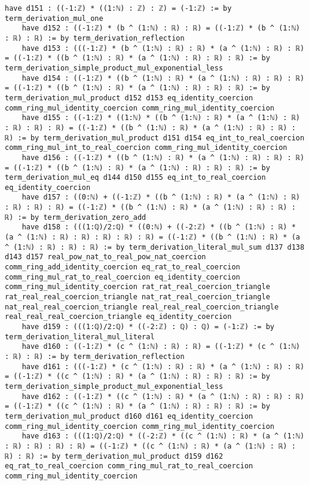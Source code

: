 \documentclass{article}
\begin{document}
\begin{tcolorbox}[colback=white!10, width=\linewidth]
\begin{lstlisting}[language=Lean4]
    have d151 : ((-1:ℤ) * ((1:ℕ) : ℤ) : ℤ) = (-1:ℤ) := by term_derivation_mul_one
    have d152 : ((-1:ℤ) * (b ^ (1:ℕ) : ℝ) : ℝ) = ((-1:ℤ) * (b ^ (1:ℕ) : ℝ) : ℝ) := by term_derivation_reflection
    have d153 : (((-1:ℤ) * (b ^ (1:ℕ) : ℝ) : ℝ) * (a ^ (1:ℕ) : ℝ) : ℝ) = ((-1:ℤ) * ((b ^ (1:ℕ) : ℝ) * (a ^ (1:ℕ) : ℝ) : ℝ) : ℝ) := by term_derivation_simple_product_mul_exponential_less
    have d154 : ((-1:ℤ) * ((b ^ (1:ℕ) : ℝ) * (a ^ (1:ℕ) : ℝ) : ℝ) : ℝ) = ((-1:ℤ) * ((b ^ (1:ℕ) : ℝ) * (a ^ (1:ℕ) : ℝ) : ℝ) : ℝ) := by term_derivation_mul_product d152 d153 eq_identity_coercion comm_ring_mul_identity_coercion comm_ring_mul_identity_coercion
    have d155 : ((-1:ℤ) * ((1:ℕ) * ((b ^ (1:ℕ) : ℝ) * (a ^ (1:ℕ) : ℝ) : ℝ) : ℝ) : ℝ) = ((-1:ℤ) * ((b ^ (1:ℕ) : ℝ) * (a ^ (1:ℕ) : ℝ) : ℝ) : ℝ) := by term_derivation_mul_product d151 d154 eq_int_to_real_coercion comm_ring_mul_int_to_real_coercion comm_ring_mul_identity_coercion
    have d156 : ((-1:ℤ) * ((b ^ (1:ℕ) : ℝ) * (a ^ (1:ℕ) : ℝ) : ℝ) : ℝ) = ((-1:ℤ) * ((b ^ (1:ℕ) : ℝ) * (a ^ (1:ℕ) : ℝ) : ℝ) : ℝ) := by term_derivation_mul_eq d144 d150 d155 eq_int_to_real_coercion eq_identity_coercion
    have d157 : ((0:ℕ) + ((-1:ℤ) * ((b ^ (1:ℕ) : ℝ) * (a ^ (1:ℕ) : ℝ) : ℝ) : ℝ) : ℝ) = ((-1:ℤ) * ((b ^ (1:ℕ) : ℝ) * (a ^ (1:ℕ) : ℝ) : ℝ) : ℝ) := by term_derivation_zero_add
    have d158 : (((1:ℚ)/2:ℚ) * ((0:ℕ) + ((-2:ℤ) * ((b ^ (1:ℕ) : ℝ) * (a ^ (1:ℕ) : ℝ) : ℝ) : ℝ) : ℝ) : ℝ) = ((-1:ℤ) * ((b ^ (1:ℕ) : ℝ) * (a ^ (1:ℕ) : ℝ) : ℝ) : ℝ) := by term_derivation_literal_mul_sum d137 d138 d143 d157 real_pow_nat_to_real_pow_nat_coercion comm_ring_add_identity_coercion eq_rat_to_real_coercion comm_ring_mul_rat_to_real_coercion eq_identity_coercion comm_ring_mul_identity_coercion rat_rat_real_coercion_triangle rat_real_real_coercion_triangle nat_rat_real_coercion_triangle nat_real_real_coercion_triangle real_real_real_coercion_triangle real_real_real_coercion_triangle eq_identity_coercion
    have d159 : (((1:ℚ)/2:ℚ) * ((-2:ℤ) : ℚ) : ℚ) = (-1:ℤ) := by term_derivation_literal_mul_literal
    have d160 : ((-1:ℤ) * (c ^ (1:ℕ) : ℝ) : ℝ) = ((-1:ℤ) * (c ^ (1:ℕ) : ℝ) : ℝ) := by term_derivation_reflection
    have d161 : (((-1:ℤ) * (c ^ (1:ℕ) : ℝ) : ℝ) * (a ^ (1:ℕ) : ℝ) : ℝ) = ((-1:ℤ) * ((c ^ (1:ℕ) : ℝ) * (a ^ (1:ℕ) : ℝ) : ℝ) : ℝ) := by term_derivation_simple_product_mul_exponential_less
    have d162 : ((-1:ℤ) * ((c ^ (1:ℕ) : ℝ) * (a ^ (1:ℕ) : ℝ) : ℝ) : ℝ) = ((-1:ℤ) * ((c ^ (1:ℕ) : ℝ) * (a ^ (1:ℕ) : ℝ) : ℝ) : ℝ) := by term_derivation_mul_product d160 d161 eq_identity_coercion comm_ring_mul_identity_coercion comm_ring_mul_identity_coercion
    have d163 : (((1:ℚ)/2:ℚ) * ((-2:ℤ) * ((c ^ (1:ℕ) : ℝ) * (a ^ (1:ℕ) : ℝ) : ℝ) : ℝ) : ℝ) = ((-1:ℤ) * ((c ^ (1:ℕ) : ℝ) * (a ^ (1:ℕ) : ℝ) : ℝ) : ℝ) := by term_derivation_mul_product d159 d162 eq_rat_to_real_coercion comm_ring_mul_rat_to_real_coercion comm_ring_mul_identity_coercion

\end{lstlisting}
\end{tcolorbox}
\end{document}
